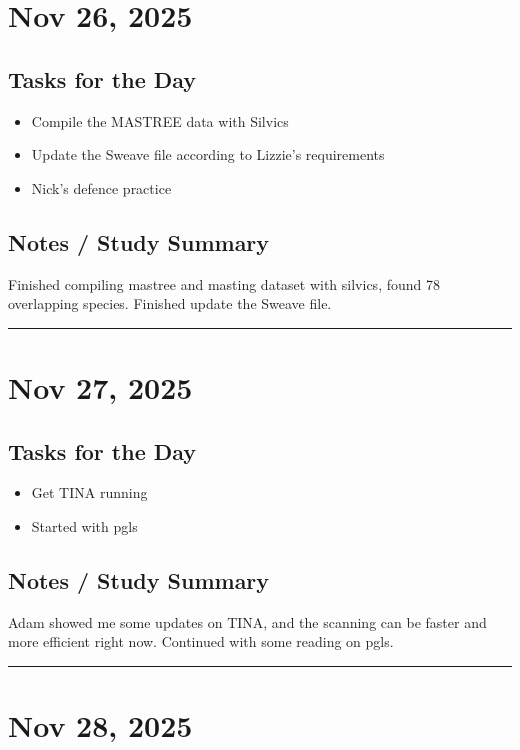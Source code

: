 \documentclass[12pt]{article}
\begin{document}
\section*{Nov 26, 2025}

\subsection*{Tasks for the Day}
\begin{itemize}
    \item Compile the MASTREE data with Silvics
    \item Update the Sweave file according to Lizzie's requirements
    \item Nick's defence practice
\end{itemize}
\subsection*{Notes / Study Summary}
Finished compiling mastree and masting dataset with silvics, found 78 overlapping species. Finished update the Sweave file.
\vspace{1em}
\hrule
\vspace{1em}

\section*{Nov 27, 2025}

\subsection*{Tasks for the Day}
\begin{itemize}
    \item Get TINA running
    \item Started with pgls
\end{itemize}
\subsection*{Notes / Study Summary}
Adam showed me some updates on TINA, and the scanning can be faster and more efficient right now. Continued with some reading on pgls.

\vspace{1em}
\hrule
\vspace{1em}

\section*{Nov 28, 2025}
\end{document}
